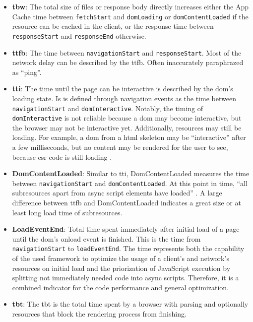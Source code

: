 \documentclass[a4paper, 12pt]{article}
\begin{document}
\begin{itemize}
  \item \textbf{\acrfull{tbw}}: The total size of files or response body directly increases either the App Cache time between \verb|fetchStart| and \verb|domLoading| or \verb|domContentLoaded| if the resource can be cached in the client, or the response time between \verb|responseStart| and \verb|responseEnd| otherwise.
  \item \textbf{\acrfull{ttfb}}: The time between \verb|navigationStart| and \verb|responseStart|.
  Most of the network delay can be described by the \acrshort{ttfb}.
  Often inaccurately paraphrazed as \enquote{ping}.
  \item \textbf{\acrfull{tti}}: The time until the page can be interactive is described by the \acrshort{dom}'s loading state.
  Is is defined through navigation events as the time between \verb|navigationStart| and \verb|domInteractive|.
  Notably, the timing of \verb|domInteractive| is not reliable because a \acrshort{dom} may become interactive, but the browser may not be interactive yet.
  Additionally, resources may still be loading.
  For example, a \acrshort{dom} from a \acrshort{html} skeleton may be \enquote{interactive} after a few milliseconds, but no content may be rendered for the user to see, because \acrshort{csr} code is still loading \citep{htmlLivingStandard}.
  \item \textbf{DomContentLoaded}: Similar to \acrshort{tti}, DomContentLoaded measures the time between \verb|navigationStart| and \verb|domContentLoaded|.
  At this point in time, \enquote{all subresources apart from async script elements have loaded} \citep{htmlLivingStandard}.
  A large difference between \acrshort{ttfb} and DomContentLoaded indicates a great size or at least long load time of subresources.
  \item \textbf{LoadEventEnd}: Total time spent immediately after initial load of a page until the \acrshort{dom}'s onload event is finished.
  This is the time from \\
  \verb|navigationStart| to \verb|loadEventEnd|.
  The time represents both the capability of the used framework to optimize the usage of a client's and network's resources on initial load and the priorization of JavaScript execution by splitting not immediately needed code into async scripts.
  Therefore, it is a combined indicator for the code performance and general optimization.
  \item \textbf{\acrfull{tbt}}: The \acrshort{tbt} is the total time spent by a browser with parsing and optionally resources that block the rendering process from finishing.

\end{itemize}
\end{document}
